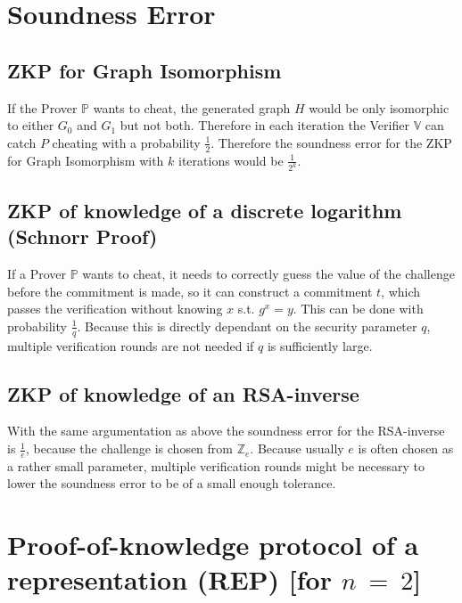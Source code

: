 \documentclass{report}
\begin{document}
	\section{Soundness Error}
	\startsection
		\subsection{ZKP for Graph Isomorphism}
		\startsubsection
			If the Prover $\mathbb{P}$ wants to cheat, the generated graph $H$ would be only isomorphic to either $G_0$ and $G_1$ but not both. Therefore in each iteration the Verifier $\mathbb{V}$ can catch $P$ cheating with a probability $\frac{1}{2}$. Therefore the soundness error for the ZKP for Graph Isomorphism with $k$ iterations would be $\frac{1}{2^k}$.
		\closesection
		\subsection{ZKP of knowledge of a discrete logarithm (Schnorr Proof)}
		\startsubsection
			If a Prover $\mathbb{P}$ wants to cheat, it needs to correctly guess the value of the challenge before the commitment is made, so it can construct a commitment $t$, which passes the verification without knowing $x$ s.t. $g^x = y$. This can be done with probability $\frac{1}{q}$. Because this is directly dependant on the security parameter $q$, multiple verification rounds are not needed if $q$ is sufficiently large.
		\closesection
		\subsection{ZKP of knowledge of an RSA-inverse}
		\startsubsection
			With the same argumentation as above the soundness error for the RSA-inverse is $\frac{1}{e}$, because the challenge is chosen from $\mathbb{Z}_e$. Because usually $e$ is often chosen as a rather small parameter, multiple verification rounds might be necessary to lower the soundness error to be of a small enough tolerance.
		\closesection
	\closesection
	
	\section{Proof-of-knowledge protocol of a representation (REP) [for $n \ = \ 2$]}
	\startsection
\end{document}
